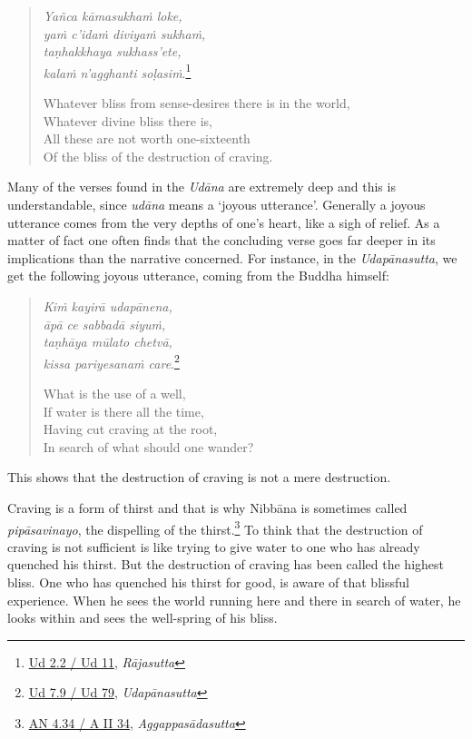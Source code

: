 \begin{quote}
\emph{Yañca kāmasukhaṁ loke,}\\
\emph{yaṁ c'idaṁ diviyaṁ sukhaṁ,}\\
\emph{taṇhakkhaya sukhass'ete,}\\
\emph{kalaṁ n'agghanti soḷasiṁ}.\footnote{\href{https://suttacentral.net/ud2.2/pli/ms}{Ud 2.2 / Ud 11}, \emph{Rājasutta}}

Whatever bliss from sense-desires there is in the world,\\
Whatever divine bliss there is,\\
All these are not worth one-sixteenth\\
Of the bliss of the destruction of craving.
\end{quote}

Many of the verses found in the \emph{Udāna} are extremely deep and this is understandable, since \emph{udāna} means a `joyous utterance'. Generally a joyous utterance comes from the very depths of one's heart, like a sigh of relief. As a matter of fact one often finds that the concluding verse goes far deeper in its implications than the narrative concerned. For instance, in the \emph{Udapānasutta}, we get the following joyous utterance, coming from the Buddha himself:

\begin{quote}
\emph{Kiṁ kayirā udapānena,}\\
\emph{āpā ce sabbadā siyuṁ,}\\
\emph{taṇhāya mūlato chetvā,}\\
\emph{kissa pariyesanaṁ care}.\footnote{\href{https://suttacentral.net/ud7.9/pli/ms}{Ud 7.9 / Ud 79}, \emph{Udapānasutta}}

What is the use of a well,\\
If water is there all the time,\\
Having cut craving at the root,\\
In search of what should one wander?
\end{quote}

This shows that the destruction of craving is not a mere destruction.

Craving is a form of thirst and that is why Nibbāna is sometimes called \emph{pipāsavinayo}, the dispelling of the thirst.\footnote{\href{https://suttacentral.net/an4.34/pli/ms}{AN 4.34 / A II 34}, \emph{Aggappasādasutta}} To think that the destruction of craving is not sufficient is like trying to give water to one who has already quenched his thirst. But the destruction of craving has been called the highest bliss. One who has quenched his thirst for good, is aware of that blissful experience. When he sees the world running here and there in search of water, he looks within and sees the well-spring of his bliss.

